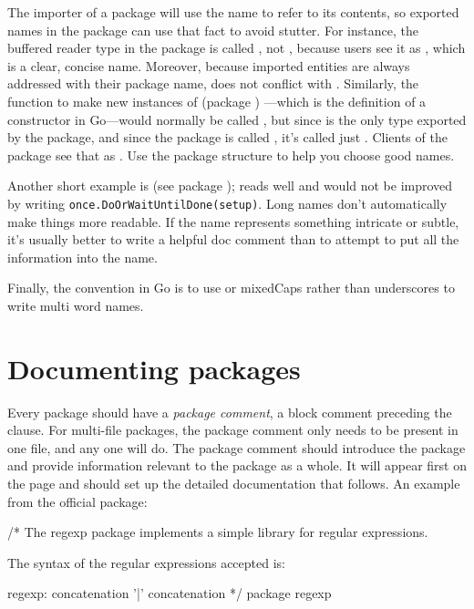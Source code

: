 The importer of a package will use the name to refer to its contents, so 
exported names in the package can use that fact to avoid
stutter. For instance, the buffered reader type in the
package is
called , not , because users see it as
,
which is a clear, concise name. Moreover, because imported entities are
always addressed with their package name,  does not conflict
with . Similarly, the function to make new instances of
 (package ) ---which is the definition of a constructor in Go---would normally
be called , but since  is the only type exported by the
package, and since the package is called
, it's called
just .
Clients of the package see that as . Use the package structure
to help you choose good names.

Another short example is  (see package );  reads well and would
not be improved by writing \lstinline{once.DoOrWaitUntilDone(setup)}. Long names
don't automatically make things more readable. If the name represents
something intricate or subtle, it's usually better to write a helpful
doc comment than to attempt to put all the information into the name.

Finally, the convention in Go is to use  or mixedCaps rather
than underscores to write multi word names.


\section{Documenting packages}
Every package should have a \emph{package comment}, a block comment preceding the
 clause. For multi-file packages, the package comment only needs to be
present in one file, and any one will do. The package comment should introduce
the package and provide information relevant to the package as a whole. It will
appear first on the  page and should set up the detailed documentation
that follows. An example from the official  package:
\begin{display}
/*
    The regexp package implements a simple library for
    regular expressions.

    The syntax of the regular expressions accepted is:

    regexp:
        concatenation { '|' concatenation }
*/
package regexp
\end{display}

